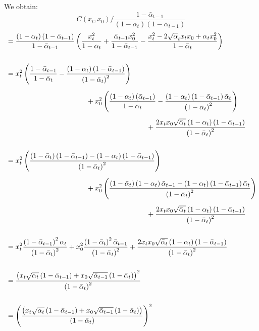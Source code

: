 \documentclass[twoside]{article}
\numberwithin{equation}{section}
\numberwithin{figure}{section}
\begin{document}
We obtain:
\begin{equation}
  C\left(x_t, x_0\right) / \frac{1 - \bar{\alpha}_{t-1}}{\left(1 - \alpha_t\right)\left(1 - \bar{\alpha}_{t-1}\right)} 
\end{equation}
\begin{align}
    &= \frac{\left(1 - \alpha_t\right)\left(1 - \bar{\alpha}_{t-1}\right)}{1 - \bar{\alpha}_{t-1}} \left( \frac{x_t^2}{1 - \alpha_t} + \frac{\bar{\alpha}_{t-1} x_0^2}{1 - \bar{\alpha}_{t-1}} - \frac{x_t^2 - 2 \sqrt{\alpha}_t x_t x_0 + \alpha_t x_0^2}{1 - \bar{\alpha}_{t}} \right) \\[15pt]
    &= x_t^2 \left(\frac{1 - \bar{\alpha}_{t-1}}{1 - \bar{\alpha}_t} - \frac{\left(1 - \alpha_t\right) \left(1 - \bar{\alpha}_{t-1}\right)}{\left(1 - \bar{\alpha}_t\right)^2}\right) \\[5pt]
    & \hspace{4cm}+ x_0^2 \left( \frac{\left(1 - \alpha_t\right)\left(\bar{\alpha}_{t-1}\right)}{1 - \bar{\alpha}_t} - \frac{\left(1 - \alpha_t\right)\left(1 - \bar{\alpha}_{t-1}\right)\bar{\alpha}_t}{\left(1 - \bar{\alpha}_t\right)^2} \right) \notag \\[5pt]
    & \hspace{7cm} + \frac{2 x_t x_0 \sqrt{\bar{\alpha}_t}\left(1 - \alpha_t\right)\left(1 - \bar{\alpha}_{t-1}\right)}{\left(1 - \bar{\alpha}_{t}\right)^2} \notag \\[15pt]
    &= x_t^2 \left(\frac{ \left( 1 - \bar{\alpha}_t \right) \left( 1 - \bar{\alpha}_{t-1} \right) - \left(1 - \alpha_t\right) \left(1 - \bar{\alpha}_{t-1}\right)}{\left(1 - \bar{\alpha}_t\right)^2}\right) \\[5pt]
    & \hspace{4cm} + x_0^2 \left( \frac{ \left( 1 - \bar{\alpha}_t \right) \left( 1 - \alpha_t \right) \bar{\alpha}_{t-1} - \left(1 - \alpha_t\right)\left(1 - \bar{\alpha}_{t-1}\right)\bar{\alpha}_t}{\left(1 - \bar{\alpha}_t\right)^2} \right) \notag \\[5pt]
    & \hspace{7cm} + \frac{2 x_t x_0 \sqrt{\bar{\alpha}_t}\left(1 - \alpha_t\right)\left(1 - \bar{\alpha}_{t-1}\right)}{\left(1 - \bar{\alpha}_{t}\right)^2} \notag \\[15pt]
    &= x_t^2 \frac{ \left( 1 - \bar{\alpha}_{t-1} \right)^2 \alpha_t }{\left(1 - \bar{\alpha}_t\right)^2} + x_0^2 \frac{\left( 1 - \bar{\alpha}_{t} \right)^2 \bar{\alpha}_{t-1}}{\left(1 - \bar{\alpha}_t\right)^2} + \frac{2 x_t x_0 \sqrt{\bar{\alpha}_t}\left(1 - \alpha_t\right)\left(1 - \bar{\alpha}_{t-1}\right)}{\left(1 - \bar{\alpha}_{t}\right)^2} \\[15pt]
    &= \frac{\left( x_t \sqrt{\alpha_t} \left( 1 - \bar{\alpha}_{t-1} \right) + x_0 \sqrt{\bar{\alpha}_{t-1}} \left( 1 - \bar{\alpha}_t \right) \right)^2}{\left(1 - \bar{\alpha}_{t}\right)^2} \\[15pt]
    &= \left(\frac{\left( x_t \sqrt{\alpha_t} \left( 1 - \bar{\alpha}_{t-1} \right) + x_0 \sqrt{\bar{\alpha}_{t-1}} \left( 1 - \bar{\alpha}_t \right) \right)}{\left(1 - \bar{\alpha}_{t}\right)} \right)^2
\end{align}
\end{document}
